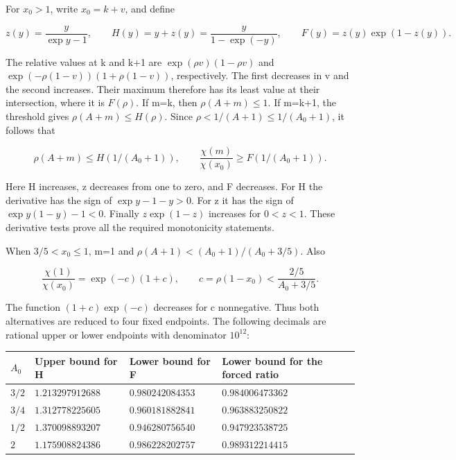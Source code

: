 \documentclass[
  11pt,
  a4paper,
]{article}
\newcounter{none} %
\begin{document}
For \(x_0>1\), write \(x_0=k+v\), and define

\[
z(y)=\frac y{\exp y-1},\qquad
H(y)=y+z(y)=\frac y{1-\exp(-y)},\qquad
F(y)=z(y)\exp(1-z(y)).
\tag{10.669}
\]

The relative values at k and k+1 are \(\exp(\rho v)(1-\rho v)\) and
\(\exp(-\rho(1-v))(1+\rho(1-v))\), respectively. The first decreases in
v and the second increases. Their maximum therefore has its least value
at their intersection, where it is \(F(\rho)\). If m=k, then
\(\rho(A+m)\le1\). If m=k+1, the threshold gives
\(\rho(A+m)\le H(\rho)\). Since \(\rho<1/(A+1)\le1/(A_0+1)\), it follows
that

\[
\rho(A+m)\le H(1/(A_0+1)),\qquad
\frac{\chi(m)}{\chi(x_0)}\ge F(1/(A_0+1)).
\tag{10.670}
\]

Here H increases, z decreases from one to zero, and F decreases. For H
the derivative has the sign of \(\exp y-1-y>0\). For z it has the sign
of \(\exp y(1-y)-1<0\). Finally \(z\exp(1-z)\) increases for \(0<z<1\).
These derivative tests prove all the required monotonicity statements.

When \(3/5<x_0\le1\), m=1 and \(\rho(A+1)<(A_0+1)/(A_0+3/5)\). Also

\[
\frac{\chi(1)}{\chi(x_0)}
=\exp(-c)(1+c),\qquad
c=\rho(1-x_0)<\frac{2/5}{A_0+3/5}.
\tag{10.671}
\]

The function \((1+c)\exp(-c)\) decreases for c nonnegative. Thus both
alternatives are reduced to four fixed endpoints. The following decimals
are rational upper or lower endpoints with denominator \(10^{12}\):

{\def\LTcaptype{none} %
\begin{longtable}[]{@{}
  >{\raggedleft\arraybackslash}p{}
  >{\raggedleft\arraybackslash}p{}
  >{\raggedleft\arraybackslash}p{}
  >{\raggedleft\arraybackslash}p{}@{}}
\toprule\noalign{}
\begin{minipage}[b]{\linewidth}\raggedleft
\(A_0\)
\end{minipage} & \begin{minipage}[b]{\linewidth}\raggedleft
Upper bound for H
\end{minipage} & \begin{minipage}[b]{\linewidth}\raggedleft
Lower bound for F
\end{minipage} & \begin{minipage}[b]{\linewidth}\raggedleft
Lower bound for the forced ratio
\end{minipage} \\
\midrule\noalign{}
\endhead
\bottomrule\noalign{}
\endlastfoot
\(3/2\) & \(1.213297912688\) & \(0.980242084353\) &
\(0.984006473362\) \\
\(3/4\) & \(1.312778225605\) & \(0.960181882841\) &
\(0.963883250822\) \\
\(1/2\) & \(1.370098893207\) & \(0.946280756540\) &
\(0.947923538725\) \\
\(2\) & \(1.175908824386\) & \(0.986228202757\) & \(0.989312214415\) \\
\end{longtable}
}
\end{document}
